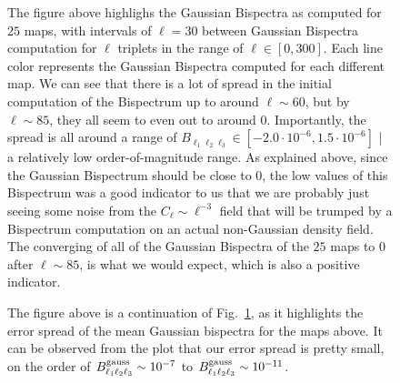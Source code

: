 \documentclass[11pt]{article}
\renewcommand{\_}[1]{\underline{ #1 }}
\begin{document}
{\begin{figure}[H]
    \centering
    \caption{The figure above highlighs the Gaussian Bispectra as computed for $25$ maps, with intervals of $\ell = 30$ between Gaussian Bispectra computation for $\ell$ triplets in the range of $\ell \in [0,300]$. Each line color represents the Gaussian Bispectra computed for each different map. We can see that there is a lot of spread in the initial computation of the Bispectrum up to around $\ell \sim 60$, but by $\ell \sim 85$, they all seem to even out to around 0. Importantly, the spread is all around a range of $B_{\ell_1 \ell_2 \ell_3} \in [-2.0\cdot 10^{-6}, 1.5 \cdot 10^{-6}]$ | a relatively low order-of-magnitude range. As explained above, since the Gaussian Bispectrum should be close to $0$, the low values of this Bispectrum was a good indicator to us that we are probably just seeing some noise from the $C_{\ell} \sim \ell^{-3}$ field that will be trumped by a Bispectrum computation on an actual non-Gaussian density field. The converging of all of the Gaussian Bispectra of the $25$ maps to 0 after $\ell \sim 85$, is what we would expect, which is also a positive indicator.}\label{fig:25maps}
\end{figure}

\begin{figure}[H]
    \centering
    \caption{The figure above is a continuation of Fig.~\ref{fig:25maps}, as it highlights the error spread of the mean Gaussian bispectra for the maps above. It can be observed from the plot that our error spread is pretty small, on the order of $B^{\rm gauss}_{\ell_1 \ell_2 \ell_3} \sim 10^{-7}$ to  $B^{\rm gauss}_{\ell_1 \ell_2 \ell_3} \sim 10^{-11}$.}\label{fig:errorspread}
\end{figure}

}
\end{document}
